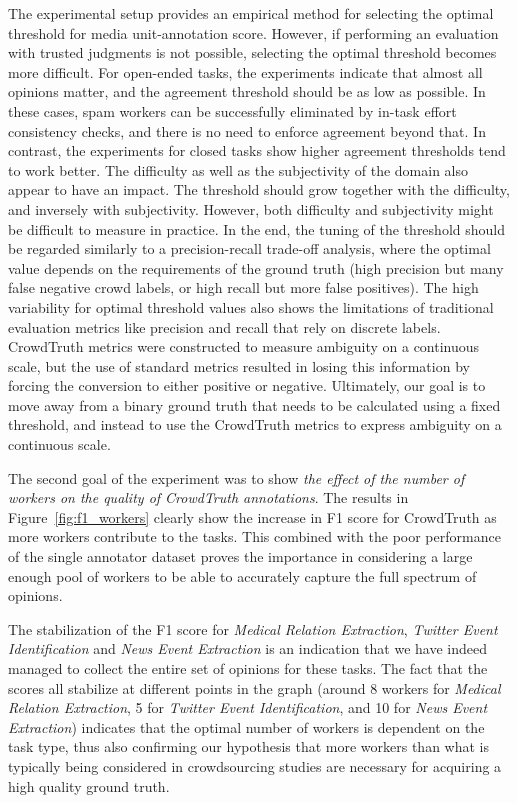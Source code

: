 The experimental setup provides an empirical method for selecting the optimal threshold for media unit-annotation score.  However, if performing an evaluation with trusted judgments is not possible, selecting the optimal threshold becomes more difficult.  For open-ended tasks, the experiments indicate that almost all opinions matter, and the agreement threshold should be as low as possible.  In these cases, spam workers can be successfully eliminated by in-task effort consistency checks, and there is no need to enforce agreement beyond that.  In contrast, the experiments for closed tasks show higher agreement thresholds tend to work better.  The difficulty as well as the subjectivity of the domain also appear to have an impact.  The threshold should grow together with the difficulty, and inversely with subjectivity.  However, both difficulty and subjectivity might be difficult to measure in practice.  In the end, the tuning of the threshold should be regarded similarly to a precision-recall trade-off analysis, where the optimal value depends on the requirements of the ground truth (high precision but many false negative crowd labels, or high recall but more false positives).  The high variability for optimal threshold values also shows the limitations of traditional evaluation metrics like precision and recall that rely on discrete labels.  CrowdTruth metrics were constructed to measure ambiguity on a continuous scale, but the use of standard metrics resulted in losing this information by forcing the conversion to either positive or negative. Ultimately, our goal is to move away from a binary ground truth that needs to be calculated using a fixed threshold, and instead to use the CrowdTruth metrics to express ambiguity on a continuous scale.

The second goal of the experiment was to show \textit{the effect of the number of workers on the quality of CrowdTruth annotations}.  The results in Figure~\ref{fig:f1_workers} clearly show the increase in F1 score for CrowdTruth as more workers contribute to the tasks. This combined with the poor performance of the single annotator dataset proves the importance in considering a large enough pool of workers to be able to accurately capture the full spectrum of opinions.

The stabilization of the F1 score for \textit{Medical Relation Extraction}, \textit{Twitter Event Identification} and \textit{News Event Extraction} is an indication that we have indeed managed to collect the entire set of opinions for these tasks.  The fact that the scores all stabilize at different points in the graph (around 8 workers for \textit{Medical Relation Extraction}, 5 for \textit{Twitter Event Identification}, and 10 for \textit{News Event Extraction}) indicates that the optimal number of workers is dependent on the task type, thus also confirming our hypothesis that more workers than what is typically being considered in crowdsourcing studies are necessary for acquiring a high quality ground truth.

